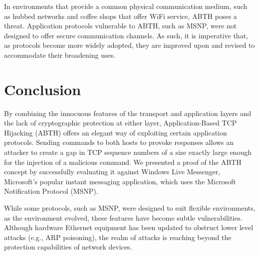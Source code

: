 \documentclass{sig-alternate}
\begin{document}
In environments that provide a common physical communication medium, such as hubbed networks and coffee shops that offer WiFi service, ABTH poses a threat.
Application protocols vulnerable to ABTH, such as MSNP, were not designed to offer secure communication channels.
As such, it is imperative that, as protocols become more widely adopted, they are improved upon and revised to accommodate their broadening uses.

\section{Conclusion}
\label{sec:conclusion}

By combining the innocuous features of the transport and application layers and the lack of cryptographic protection at either layer, Application-Based TCP Hijacking (ABTH) offers an elegant way of exploiting certain application protocols.
Sending commands to both hosts to provoke responses allows an attacker to create a gap in TCP sequence numbers of a size exactly large enough for the injection of a malicious command.
We presented a proof of the ABTH concept by successfully evaluating it against Windows Live Messenger, Microsoft's popular instant messaging application, which uses the Microsoft Notification Protocol (MSNP).

While some protocols, such as MSNP, were designed to suit flexible environments, as the environment evolved, these features have become subtle vulnerabilities.
Although hardware Ethernet equipment has been updated to obstruct lower level attacks (e.g., ARP poisoning), the realm of attacks is reaching beyond the protection capabilities of network devices.



\end{document}
